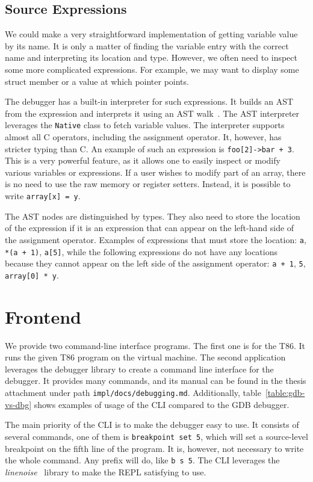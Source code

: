 \subsection{Source Expressions}
We could make a very straightforward implementation of getting variable value
by its name. It is only a matter of finding the variable entry with the correct
name and interpreting its location and type. However, we often need to inspect
some more complicated expressions. For example, we may want to display some
struct member or a value at which pointer points.

The debugger has a built-in interpreter for such expressions. It builds an AST
from the expression and interprets it using an AST
walk~\cite{crafting-interpreters}. The AST interpreter leverages the
\texttt{Native} class to fetch variable values. The interpreter supports almost
all C operators, including the assignment operator. It, however, has stricter
typing than C. An example of such an expression is \texttt{foo[2]->bar + 3}.
This is a very powerful feature, as it allows one to easily inspect or modify
various variables or expressions. If a user wishes to modify part of an array,
there is no need to use the raw memory or register setters. Instead, it is
possible to write \texttt{array[x] = y}.

The AST nodes are distinguished by types. They also need to store the location
of the expression if it is an expression that can appear on the left-hand side
of the assignment operator. Examples of expressions that must store the
location: \texttt{a}, \texttt{*(a + 1)}, \texttt{a[5]}, while the following
expressions do not have any locations because they cannot appear on the left
side of the assignment operator: \texttt{a + 1}, \texttt{5}, \texttt{array[0] *
y}.

\section{Frontend}
We provide two command-line interface programs. The first one is for the T86.
It runs the given T86 program on the virtual machine. The second application
leverages the debugger library to create a command line interface for the
debugger. It provides many commands, and its manual can be found in the thesis
attachment under path \texttt{impl/docs/debugging.md}. Additionally,
table~\ref{table:gdb-vs-dbg} shows examples of usage of the CLI compared to the
GDB debugger.

The main priority of the CLI is to make the debugger easy to use. It consists
of several commands, one of them is \texttt{breakpoint set 5}, which will set a
source-level breakpoint on the fifth line of the program. It is, however, not
necessary to write the whole command. Any prefix will do, like \texttt{b s 5}.
The CLI leverages the \textit{linenoise}~\cite{linenoise} library to make the
REPL satisfying to use.

